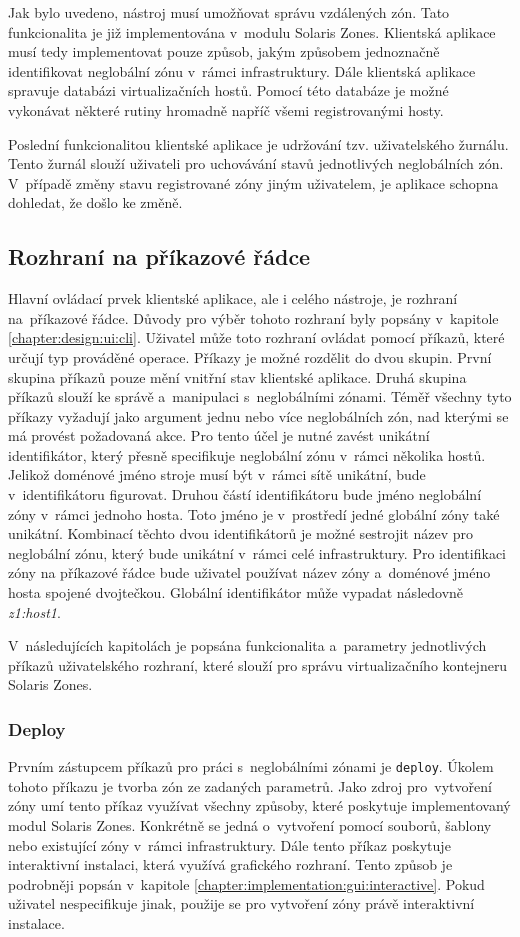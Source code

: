 Jak bylo uvedeno, nástroj musí umožňovat správu vzdálených zón. Tato funkcionalita
je již implementována v~modulu Solaris Zones. Klientská aplikace musí tedy implementovat pouze způsob, jakým způsobem jednoznačně identifikovat
neglobální zónu v~rámci infrastruktury. Dále klientská aplikace spravuje databázi virtualizačních hostů. Pomocí této databáze
je možné vykonávat některé rutiny hromadně napříč všemi registrovanými hosty.

Poslední funkcionalitou klientské aplikace je udržování tzv. uživatelského žurnálu. Tento žurnál slouží uživateli pro uchovávání
stavů jednotlivých neglobálních zón. V~případě změny stavu registrované zóny jiným uživatelem, je aplikace schopna dohledat,
že došlo ke změně.
\subsection{Rozhraní na příkazové řádce}
\label{chapter:implementation:client:cli}
Hlavní ovládací prvek klientské aplikace, ale i celého nástroje, je rozhraní na~příkazové řádce. Důvody pro výběr tohoto rozhraní
byly popsány v~kapitole \ref{chapter:design:ui:cli}. Uživatel může toto rozhraní ovládat pomocí příkazů, které určují typ 
prováděné operace. Příkazy je možné rozdělit do dvou skupin. První skupina příkazů pouze mění vnitřní stav klientské aplikace.
Druhá skupina příkazů slouží ke správě a~manipulaci s~neglobálními zónami. Téměř všechny tyto příkazy vyžadují jako argument jednu
nebo více neglobálních zón, nad kterými se má provést požadovaná akce. Pro tento účel je nutné zavést unikátní identifikátor,
který přesně specifikuje neglobální zónu v~rámci několika hostů. Jelikož doménové jméno stroje musí být v~rámci sítě
unikátní, bude v~identifikátoru figurovat. Druhou částí identifikátoru bude jméno neglobální zóny v~rámci jednoho hosta.
Toto jméno je v~prostředí jedné globální zóny také unikátní. Kombinací těchto dvou identifikátorů je možné sestrojit název
pro neglobální zónu, který bude unikátní v~rámci celé infrastruktury. Pro identifikaci zóny na příkazové řádce bude uživatel
používat název zóny a~doménové jméno hosta spojené dvojtečkou. Globální identifikátor může vypadat následovně \textit{z1:host1}.

V~následujících kapitolách je popsána funkcionalita a~parametry jednotlivých příkazů uživatelského rozhraní, které slouží
pro správu virtualizačního kontejneru Solaris Zones.
\subsubsection{Deploy}
\label{chapter:implementation:client:cli:deploy}
Prvním zástupcem příkazů pro práci s~neglobálními zónami je \verb|deploy|. Úkolem tohoto příkazu je tvorba zón ze zadaných parametrů.
Jako zdroj pro~vytvoření zóny umí tento příkaz využívat všechny způsoby, které poskytuje implementovaný modul Solaris Zones.
Konkrétně se jedná o~vytvoření pomocí souborů, šablony nebo existující zóny v~rámci infrastruktury. Dále tento příkaz poskytuje
interaktivní instalaci, která využívá grafického rozhraní. Tento způsob je podrobněji popsán v~kapitole
\ref{chapter:implementation:gui:interactive}. Pokud uživatel nespecifikuje jinak, použije se pro vytvoření zóny právě interaktivní
instalace.

